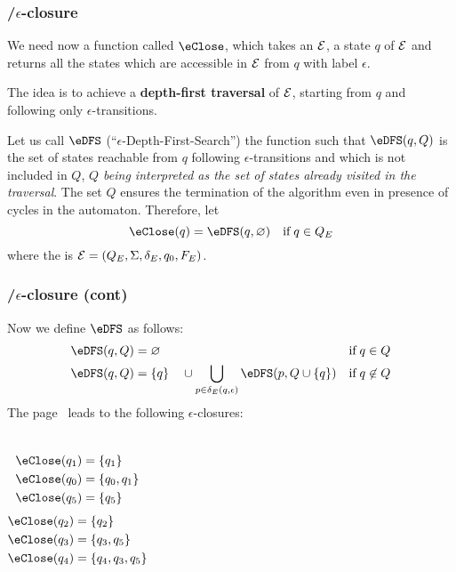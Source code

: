 % 
\begin{frame}
\frametitle{\eNFA{}/\(\epsilon\)-closure}

We need now a function called \textbf{\(\eClose\)}, which takes an
\eNFA \(\cal E\), a state \(q\) of \(\cal E\) and returns all the
states which are accessible in \(\cal E\) from \(q\) with label
\(\epsilon\).

\bigskip

The idea is to achieve a \textbf{depth-first traversal} of \(\cal E\),
starting from \(q\) and following only \(\epsilon\)-transitions.

\bigskip

Let us call \(\eDFS\) (``\(\epsilon\)-Depth-First-Search'') the
function such that \(\eDFS(q, Q)\) is the set of states reachable from
\(q\) following \(\epsilon\)-transitions and which is not included in
\(Q\), \emph{\(Q\) being interpreted as the set of states already
  visited in the traversal}. The set \(Q\) ensures the termination of
the algorithm even in presence of cycles in the automaton. Therefore,
let
\[
\eClose (q) = \eDFS (q, \varnothing) \quad \text{if} \; q \in Q_E
\]
where the \eNFA is \({\cal E} = (Q_E, \Sigma, \delta_E, q_0, F_E)\).

\end{frame}

% 
\begin{frame}
\frametitle{\eNFA{}/\(\epsilon\)-closure (cont)}

Now we define \(\eDFS\) as follows:
\begin{align}
   \eDFS (q, Q) 
&= \varnothing 
& \text{if} \; q \in Q \label{eDFS_1}\\
  \eDFS (q, Q) 
&= \{q\} \quad \cup \bigcup_{p \in \delta_E(q,\epsilon)}{\eDFS (p, Q
    \cup \{q\})}
& \text{if} \; q \not\in Q \label{eDFS_2}
\end{align}
The \eNFA page~\pageref{enfa_num} leads to the
following \(\epsilon\)-closures:

\bigskip

\begin{columns}
    \begin{align*}
      \eClose (q_1) &= \{q_1\}\\
      \eClose (q_0) &= \{q_0, q_1\}\\
      \eClose (q_5) &= \{q_5\}
    \end{align*}
  \begin{align*}
    \eClose (q_2) &= \{q_2\}\\
    \eClose (q_3) &= \{q_3, q_5\}\\
    \eClose (q_4) &= \{q_4, q_3, q_5\}
  \end{align*}
\end{columns}

\end{frame}

